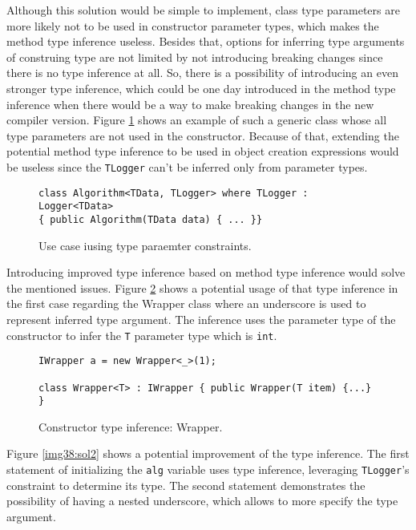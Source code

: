 Although this solution would be simple to implement, class type parameters are more likely not to be used in constructor parameter types, which makes the method type inference useless. 
Besides that, options for inferring type arguments of construing type are not limited by not introducing breaking changes since there is no type inference at all. 
So, there is a possibility of introducing an even stronger type inference, which could be one day introduced in the method type inference when there would be a way to make breaking changes in the new compiler version. 
Figure \ref{img36:cti} shows an example of such a generic class whose all type parameters are not used in the constructor.
Because of that, extending the potential method type inference to be used in object creation expressions would be useless since the \texttt{TLogger} can’t be inferred only from parameter types.
\begin{figure}[h]
\begin{lstlisting}[style=csharp]
class Algorithm<TData, TLogger> where TLogger : Logger<TData> 
{ public Algorithm(TData data) { ... }}
\end{lstlisting}
\caption{Use case iusing type paraemter constraints.}
\label{img36:cti}
\end{figure}
\par
{}
Introducing improved type inference based on method type inference would solve the mentioned issues. 
Figure \ref{img37:sol1} shows a potential usage of that type inference in the first case regarding the Wrapper class where an underscore is used to represent inferred type argument. 
The inference uses the parameter type of the constructor to infer the \texttt{T} parameter type which is \texttt{int}.
\begin{figure}[h]
\begin{lstlisting}[style=csharp]
IWrapper a = new Wrapper<_>(1);

class Wrapper<T> : IWrapper { public Wrapper(T item) {...} }
\end{lstlisting}
\caption{Constructor type inference: Wrapper.}
\label{img37:sol1}
\end{figure}
\par
{}
Figure \ref{img38:sol2} shows a potential improvement of the type inference. 
The first statement of initializing the \texttt{alg} variable uses type inference, leveraging \texttt{TLogger}’s constraint to determine its type. 
The second statement demonstrates the possibility of having a nested underscore, which allows to more specify the type argument.
